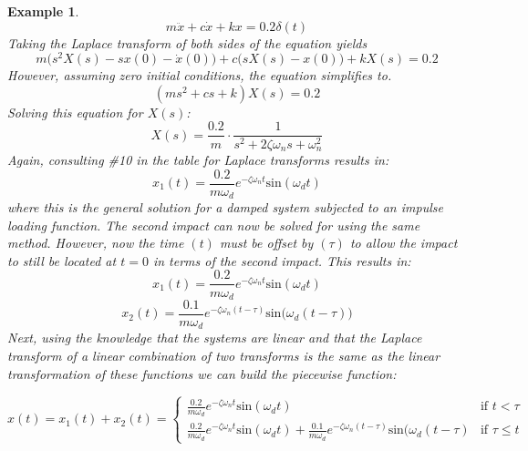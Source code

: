 \documentclass[12pt,letter]{article}
\newtheorem{ex}{Example}
\numberwithin{ex}{section} %
\newenvironment{example}{\begin{mdframed}[middlelinewidth=0.5mm]\begin{ex}\normalfont}{\end{ex}\end{mdframed}}
\begin{document}
\begin{example}
\begin{equation}
m\ddot{x} +c\dot{x} +kx =0.2 \delta(t)
\end{equation}
Taking the Laplace transform of both sides of the equation yields 
\begin{equation}
m\big(s^2X(s)-sx(0) - \dot{x}(0)\big) + c\big(sX(s)-x(0)\big) +kX(s) = 0.2
\end{equation}
However, assuming zero initial conditions, the equation simplifies to. 
\begin{equation}
(ms^2 + cs +k)X(s) = 0.2
\end{equation}
Solving this equation for $X(s)$:
\begin{equation}
X(s) = \frac{0.2}{m} \cdot \frac{1}{s^2 + 2 \zeta \omega_n s + \omega_n^2}
\end{equation}
Again, consulting \#10 in the table for Laplace transforms results in:
\begin{equation}
x_1(t) = \frac{0.2}{m \omega_d} e^{-\zeta \omega_n t} \text{sin}(\omega_dt)
\end{equation}
where this is the general solution for a damped system subjected to an impulse loading function. The second impact can now be solved for using the same method. However, now the time $(t)$ must be offset by $(\tau)$ to allow the impact to still be located at $t=0$ in terms of the second impact. This results in:
\begin{equation}
	x_1(t) = \frac{0.2}{m \omega_d} e^{-\zeta \omega_n t} \text{sin}(\omega_dt)
\end{equation}
\begin{equation}
	x_2(t) = \frac{0.1}{m \omega_d} e^{-\zeta \omega_n (t-\tau)} \text{sin}\big(\omega_d(t-\tau)\big)
\end{equation}
Next, using the knowledge that the systems are linear and that the Laplace transform of a linear combination of two transforms is the same as the linear transformation of these functions we can build the piecewise function:

\[
  x(t) = x_1(t) + x_2(t) =
  \begin{cases}
\frac{0.2}{m \omega_d} e^{-\zeta \omega_n t} \text{sin}(\omega_dt) & \text{if } t < \tau \\
\frac{0.2}{m \omega_d} e^{-\zeta \omega_n t} \text{sin}(\omega_dt)  + \frac{0.1}{m \omega_d} e^{-\zeta \omega_n (t-\tau)} \text{sin}(\omega_d(t-\tau) & \text{if } \tau \leq t 
  \end{cases}
\]



\end{example}
\end{document}
